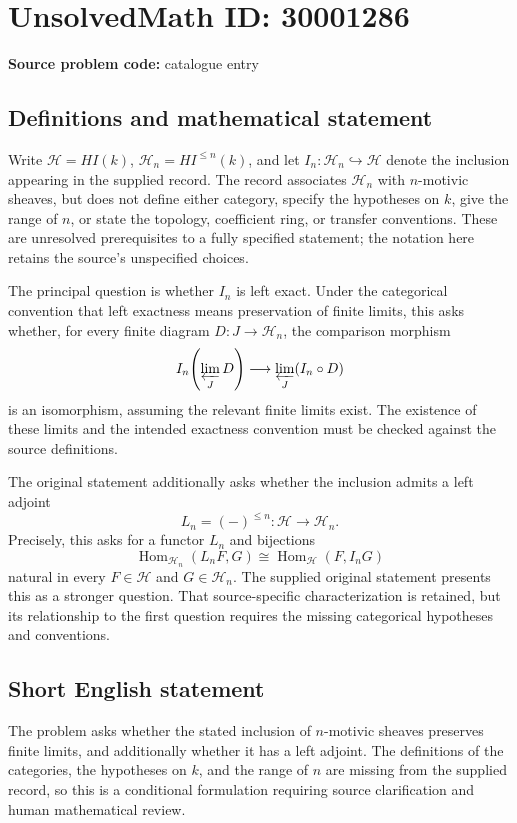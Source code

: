 \documentclass[11pt]{article}
\begin{document}
\section*{UnsolvedMath ID: 30001286}
\textbf{Source problem code:} catalogue entry
\subsection{Definitions and mathematical statement}
Write \(\mathcal H=HI(k)\), \(\mathcal H_n=HI^{\leq n}(k)\), and let \(I_n:\mathcal H_n\hookrightarrow\mathcal H\) denote the inclusion appearing in the supplied record. The record associates \(\mathcal H_n\) with \(n\)-motivic sheaves, but does not define either category, specify the hypotheses on \(k\), give the range of \(n\), or state the topology, coefficient ring, or transfer conventions. These are unresolved prerequisites to a fully specified statement; the notation here retains the source's unspecified choices.

The principal question is whether \(I_n\) is left exact. Under the categorical convention that left exactness means preservation of finite limits, this asks whether, for every finite diagram \(D:J\to\mathcal H_n\), the comparison morphism
\[
I_n\!\left(\varprojlim_J D\right)\longrightarrow\varprojlim_J(I_n\circ D)
\]
is an isomorphism, assuming the relevant finite limits exist. The existence of these limits and the intended exactness convention must be checked against the source definitions.

The original statement additionally asks whether the inclusion admits a left adjoint
\[
L_n=(-)^{\leq n}:\mathcal H\longrightarrow\mathcal H_n.
\]
Precisely, this asks for a functor \(L_n\) and bijections
\[
\operatorname{Hom}_{\mathcal H_n}(L_nF,G)\cong\operatorname{Hom}_{\mathcal H}(F,I_nG)
\]
natural in every \(F\in\mathcal H\) and \(G\in\mathcal H_n\). The supplied original statement presents this as a stronger question. That source-specific characterization is retained, but its relationship to the first question requires the missing categorical hypotheses and conventions.
\subsection{Short English statement}
The problem asks whether the stated inclusion of \(n\)-motivic sheaves preserves finite limits, and additionally whether it has a left adjoint. The definitions of the categories, the hypotheses on \(k\), and the range of \(n\) are missing from the supplied record, so this is a conditional formulation requiring source clarification and human mathematical review.
\end{document}
